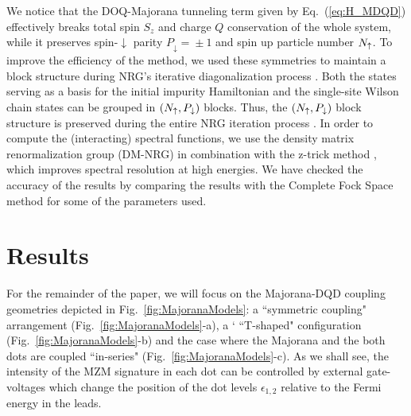 \documentclass[showpacs,aps,prb,reprint,superscriptaddress]{revtex4-1}
\begin{document}
We notice that the DOQ-Majorana tunneling term given by Eq.\ (\ref{eq:H_MDQD}) effectively breaks total spin $S_z$ and charge $Q$ conservation of the whole system, while it preserves spin-$\downarrow$ parity $P_{\downarrow}\!=\! \pm 1$ and spin up particle number $N_\uparrow$. To  improve the efficiency of the method, we used these symmetries to maintain a block structure during NRG's iterative diagonalization process  \cite{bulla_numerical_2008,lee_kondo_2013,ruiz-tijerina_interaction_2015}. 
Both the states serving as a basis for the initial impurity Hamiltonian and the single-site Wilson chain states can be grouped in $(N_\uparrow,P_\downarrow)$ blocks. Thus, the $(N_\uparrow,P_\downarrow)$ block structure is preserved during the entire NRG iteration process \cite{bulla_numerical_2008}. In order to compute the (interacting) spectral functions, we use the density matrix renormalization group (DM-NRG) \cite{hofstetter_generalized_2000} in combination with the z-trick method \cite{oliveira_generalized_1994}, which improves spectral resolution at high energies. We have checked the accuracy of the results by comparing the results with the Complete Fock Space method \cite{Peters:Phys.Rev.B:245114:2006} for some of the parameters used.






  


 \section{Results \label{sec:results}}




For the remainder of the paper, we will focus on the Majorana-DQD coupling geometries depicted in Fig.\ \ref{fig:MajoranaModels}: a ``symmetric coupling"  arrangement (Fig.\ \ref{fig:MajoranaModels}-a), a ` ``T-shaped" configuration (Fig.\ \ref{fig:MajoranaModels}-b) and the case where the Majorana and the both dots are coupled  ``in-series" (Fig.\ \ref{fig:MajoranaModels}-c). As we shall see, the intensity of the MZM  signature in each dot can be controlled by external gate-voltages which change the position of the dot levels $\epsilon_{1,2}$ relative to the Fermi energy in the leads.
\end{document}
